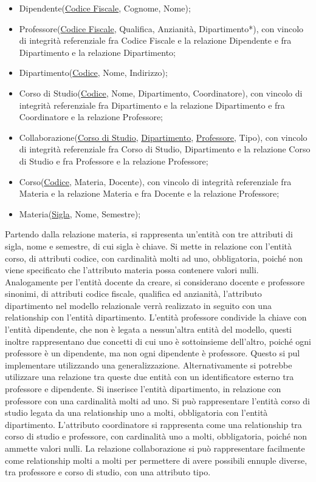 \documentclass{article}
\numberwithin{equation}{subsection}
\begin{document}
\begin{itemize}
    \item Dipendente(\underline{Codice Fiscale}, Cognome, Nome);
    \item Professore(\underline{Codice Fiscale}, Qualifica, Anzianità, Dipartimento*), con vincolo di integrità referenziale fra Codice Fiscale e la relazione Dipendente e fra Dipartimento e la relazione Dipartimento;
    \item Dipartimento(\underline{Codice}, Nome, Indirizzo);
    \item Corso di Studio(\underline{Codice}, Nome, Dipartimento, Coordinatore), con vincolo di integrità referenziale fra Dipartimento e la relazione Dipartimento e fra Coordinatore e la relazione Professore;
    \item Collaborazione(\underline{Corso di Studio}, \underline{Dipartimento}, \underline{Professore}, Tipo), con vincolo di integrità referenziale fra Corso di Studio, Dipartimento e la relazione Corso di Studio e fra Professore e la relazione Professore;
    \item Corso(\underline{Codice}, Materia, Docente), con vincolo di integrità referenziale fra Materia e la relazione Materia e fra Docente e la relazione Professore;
    \item Materia(\underline{Sigla}, Nome, Semestre);
\end{itemize}

Partendo dalla relazione materia, si rappresenta un'entità con tre attributi di sigla, nome e semestre, di cui sigla è chiave. Si mette in relazione con l'entità corso, di attributi codice, con cardinalità 
molti ad uno, obbligatoria, poiché non viene specificato che l'attributo materia possa contenere valori nulli. Analogamente per l'entità docente da creare, si considerano docente e professore sinonimi, di 
attributi codice fiscale, qualifica ed anzianità, l'attributo dipartimento nel modello relazionale verrà realizzato in seguito con una relationship con l'entità dipartimento. L'entità professore condivide la 
chiave con l'entità dipendente, che non è legata a nessun'altra entità del modello, questi inoltre rappresentano due concetti di cui uno è sottoinsieme dell'altro, poiché ogni professore è un dipendente, ma 
non ogni dipendente è professore. Questo si pul implementare utilizzando una generalizzazione. Alternativamente si potrebbe utilizzare una relazione tra queste due entità con un identificatore esterno tra 
professore e dipendente. Si inserisce l'entità dipartimento, in relazione con professore con una cardinalità molti ad uno. Si può rappresentare l'entità corso di studio legata da una relationship uno a molti, obbligatoria 
con l'entità dipartimento. L'attributo coordinatore si rappresenta come una relationship tra corso di studio e professore, con cardinalità uno a molti, obbligatoria, poiché non ammette valori nulli. La relazione 
collaborazione si può rappresentare facilmente come relationship molti a molti per permettere di avere possibili ennuple diverse, tra professore e corso di studio, con una attributo tipo. 
\end{document}
